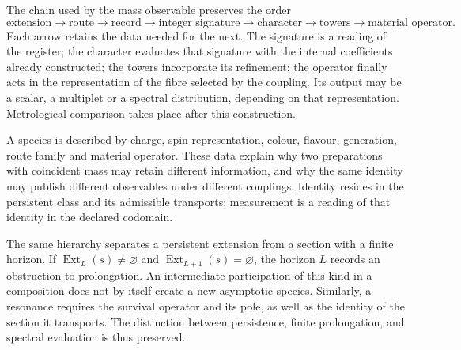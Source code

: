 The chain used by the mass observable preserves the order
\begin{equation}
 \text{extension}\longrightarrow\text{route}\longrightarrow
 \text{record}\longrightarrow\text{integer signature}\longrightarrow
 \text{character}\longrightarrow\text{towers}\longrightarrow
 \text{material operator}.
 \label{vi:vi:eq:cadena-material}
\end{equation}
Each arrow retains the data needed for the next. The signature is
a reading of the register; the character evaluates that signature with the
internal coefficients already constructed; the towers incorporate its
refinement; the operator finally acts in the representation of the
fibre selected by the coupling. Its output may be a scalar,
a multiplet or a spectral distribution, depending on that representation.
Metrological comparison takes place after this construction.

A species is described by charge, spin representation, colour,
flavour, generation, route family and material operator. These data
explain why two preparations with coincident mass may
retain different information, and why the same identity may
publish different observables under different couplings.
Identity resides in the persistent class and its admissible transports;
measurement is a reading of that identity in the declared codomain.

The same hierarchy separates a persistent extension from a section with a
finite horizon. If $\operatorname{Ext}_L(s)\ne\varnothing$ and
$\operatorname{Ext}_{L+1}(s)=\varnothing$, the horizon $L$ records
an obstruction to prolongation. An intermediate participation of this
kind in a composition does not by itself create a new asymptotic
species. Similarly, a resonance requires the survival
operator and its pole, as well as the identity of the section
it transports. The distinction between persistence,
finite prolongation, and spectral evaluation is thus preserved.
